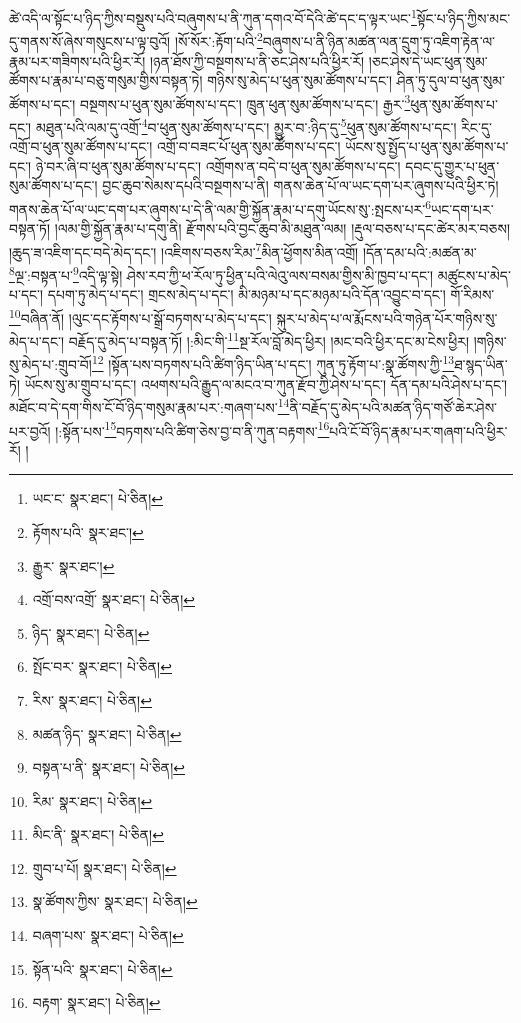 ཚེ་འདི་ལ་སྟོང་པ་ཉིད་ཀྱིས་བསྡུས་པའི་བཞུགས་པ་ནི་ཀུན་དགའ་བོ་དེའི་ཚེ་དང་ད་ལྟར་ཡང་\footnote{ཡང་ང་  སྣར་ཐང་།  པེ་ཅིན། }སྟོང་པ་ཉིད་ཀྱིས་མང་དུ་གནས་སོ་ཞེས་གསུངས་པ་ལྟ་བུའོ། །སོ་སོར་:རྟོག་པའི་\footnote{རྟོགས་པའི་  སྣར་ཐང་། }བཞུགས་པ་ནི་ཉིན་མཚན་ལན་དྲུག་ཏུ་འཇིག་རྟེན་ལ་རྣམ་པར་གཟིགས་པའི་ཕྱིར་རོ། །ཉན་ཐོས་ཀྱི་བསྔགས་པ་ནི་ཅང་ཤེས་པའི་ཕྱིར་རོ། །ཅང་ཤེས་དེ་ཡང་ཕུན་སུམ་ཚོགས་པ་རྣམ་པ་བཅུ་གསུམ་གྱིས་བསྟན་ཏེ། གཉིས་སུ་མེད་པ་ཕུན་སུམ་ཚོགས་པ་དང་། ཤིན་ཏུ་དུལ་བ་ཕུན་སུམ་ཚོགས་པ་དང་། བསྔགས་པ་ཕུན་སུམ་ཚོགས་པ་དང་། ཁྲུན་ཕུན་སུམ་ཚོགས་པ་དང་། རྒྱར་\footnote{རྒྱུར་  སྣར་ཐང་། }ཕུན་སུམ་ཚོགས་པ་དང་། མཐུན་པའི་ལམ་དུ་འགྲོ་\footnote{འགྲོ་བས་འགྲོ་  སྣར་ཐང་།  པེ་ཅིན། }བ་ཕུན་སུམ་ཚོགས་པ་དང་། མྱུར་བ་:ཉིད་དུ་\footnote{ཉིད་  སྣར་ཐང་།  པེ་ཅིན། }ཕུན་སུམ་ཚོགས་པ་དང་། རིང་དུ་འགྲོ་བ་ཕུན་སུམ་ཚོགས་པ་དང་། འགྲོ་བ་བཟང་པོ་ཕུན་སུམ་ཚོགས་པ་དང་། ཡོངས་སུ་སྤྱོད་པ་ཕུན་སུམ་ཚོགས་པ་དང་། ཉེ་བར་ཞི་བ་ཕུན་སུམ་ཚོགས་པ་དང་། འགྲོགས་ན་བདེ་བ་ཕུན་སུམ་ཚོགས་པ་དང་། དབང་དུ་གྱུར་པ་ཕུན་སུམ་ཚོགས་པ་དང་། བྱང་ཆུབ་སེམས་དཔའི་བསྔགས་པ་ནི། གནས་ཆེན་པོ་ལ་ཡང་དག་པར་ཞུགས་པའི་ཕྱིར་ཏེ། གནས་ཆེན་པོ་ལ་ཡང་དག་པར་ཞུགས་པ་དེ་ནི་ལམ་གྱི་སྐྱོན་རྣམ་པ་དགུ་ཡོངས་སུ་:སྤངས་པར་\footnote{སྤོང་བར་  སྣར་ཐང་།  པེ་ཅིན། }ཡང་དག་པར་བསྟན་ཏོ། །ལམ་གྱི་སྐྱོན་རྣམ་པ་དགུ་ནི། རྫོགས་པའི་བྱང་ཆུབ་མི་མཐུན་ལམ། །རྡུལ་བཅས་པ་དང་ཚེར་མར་བཅས། །ཆུད་ཟ་འཇིག་དང་བདེ་མེད་དང་། །འཇིགས་བཅས་རིམ་\footnote{རིས་  སྣར་ཐང་།  པེ་ཅིན། }མིན་ཕྱོགས་མིན་འགྲོ། །དོན་དམ་པའི་:མཚན་མ་\footnote{མཚན་ཉིད་  སྣར་ཐང་།  པེ་ཅིན། }ལྔ་:བསྟན་པ་\footnote{བསྟན་པ་ནི་  སྣར་ཐང་།  པེ་ཅིན། }འདི་ལྟ་སྟེ། ཤེས་རབ་ཀྱི་ཕ་རོལ་ཏུ་ཕྱིན་པའི་ལེའུ་ལས་བསམ་གྱིས་མི་ཁྱབ་པ་དང་། མཚུངས་པ་མེད་པ་དང་། དཔག་ཏུ་མེད་པ་དང་། གྲངས་མེད་པ་དང་། མི་མཉམ་པ་དང་མཉམ་པའི་དོན་འབྱུང་བ་དང་། གོ་རིམས་\footnote{རིམ་  སྣར་ཐང་།  པེ་ཅིན། }བཞིན་ནོ། །ལུང་དང་རྟོགས་པ་སྒྲོ་བཏགས་པ་མེད་པ་དང་། སྐུར་པ་མེད་པ་ལ་རྨོངས་པའི་གཉེན་པོར་གཉིས་སུ་མེད་པ་དང་། བརྗོད་དུ་མེད་པ་བསྟན་ཏོ། །:མིང་གི་\footnote{མིང་ནི་  སྣར་ཐང་།  པེ་ཅིན། }སྔ་རོལ་བློ་མེད་ཕྱིར། །མང་བའི་ཕྱིར་དང་མ་ངེས་ཕྱིར། །གཉིས་སུ་མེད་པ་:གྲུབ་བོ།\footnote{གྲུབ་པ་པོ།  སྣར་ཐང་།  པེ་ཅིན། } །སྟོན་པས་བཏགས་པའི་ཚིག་ཉིད་ཡིན་པ་དང་། ཀུན་ཏུ་རྟོག་པ་:སྣ་ཚོགས་ཀྱི་\footnote{སྣ་ཚོགས་ཀྱིས་  སྣར་ཐང་།  པེ་ཅིན། }ཐ་སྙད་ཡིན་ཏེ། ཡོངས་སུ་མ་གྲུབ་པ་དང་། འཕགས་པའི་རྒྱུད་ལ་མངའ་བ་ཀུན་རྫོབ་ཀྱི་ཤེས་པ་དང་། དོན་དམ་པའི་ཤེས་པ་དང་། མཐོང་བ་དེ་དག་གིས་ངོ་བོ་ཉིད་གསུམ་རྣམ་པར་:གཞག་པས་\footnote{བཞག་པས་  སྣར་ཐང་།  པེ་ཅིན། }ནི་བརྗོད་དུ་མེད་པའི་མཚན་ཉིད་གཙོ་ཆེར་ཤེས་པར་བྱའོ། །:སྟོན་པས་\footnote{སྟོན་པའི་  སྣར་ཐང་།  པེ་ཅིན། }བཏགས་པའི་ཚིག་ཅེས་བྱ་བ་ནི་ཀུན་བརྟགས་\footnote{བརྟག་  སྣར་ཐང་།  པེ་ཅིན། }པའི་ངོ་བོ་ཉིད་རྣམ་པར་གཞག་པའི་ཕྱིར་རོ། །
